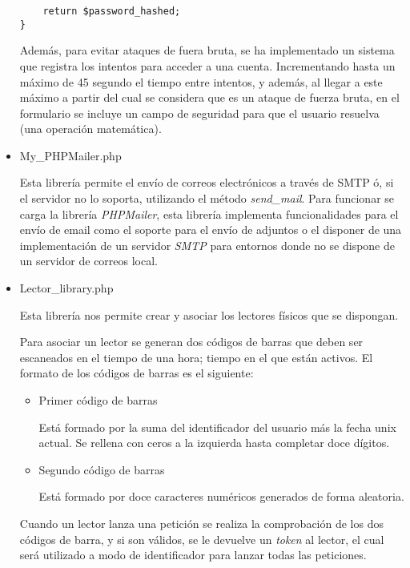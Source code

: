 \begin{itemize}
\begin{lstlisting}
    return $password_hashed;
}
            \end{lstlisting}

            Además, para evitar ataques de fuera bruta, se ha implementado un sistema que registra los intentos para acceder a una cuenta. Incrementando hasta un máximo de 45 segundo el tiempo entre intentos, y además, al llegar a este máximo a partir del cual se considera que es un ataque de fuerza bruta, en el formulario se incluye un campo de seguridad para que el usuario resuelva (una operación matemática).

        \item My\_PHPMailer.php

            Esta librería permite el envío de correos electrónicos a través de SMTP ó, si el servidor no lo soporta, utilizando el método \emph{send\_mail}. Para funcionar se carga la librería \emph{PHPMailer}, esta librería implementa funcionalidades para el envío de email como el soporte para el envío de adjuntos o el disponer de una implementación de un servidor \emph{SMTP} para entornos donde no se dispone de un servidor de correos local.

        \item Lector\_library.php

            Esta librería nos permite crear y asociar los lectores físicos que se dispongan.

            Para asociar un lector se generan dos códigos de barras que deben ser escaneados en el tiempo de una hora; tiempo en el que están activos. El formato de los códigos de barras es el siguiente:

            \begin{itemize}
                \item Primer código de barras

                    Está formado por la suma del identificador del usuario más la fecha unix actual. Se rellena con ceros a la izquierda hasta completar doce dígitos.

                \item Segundo código de barras

                    Está formado por doce caracteres numéricos generados de forma aleatoria.
            \end{itemize}

            Cuando un lector lanza una petición se realiza la comprobación de los dos códigos de barra, y si son válidos, se le devuelve un \emph{token} al lector, el cual será utilizado a modo de identificador para lanzar todas las peticiones.


\end{itemize}
